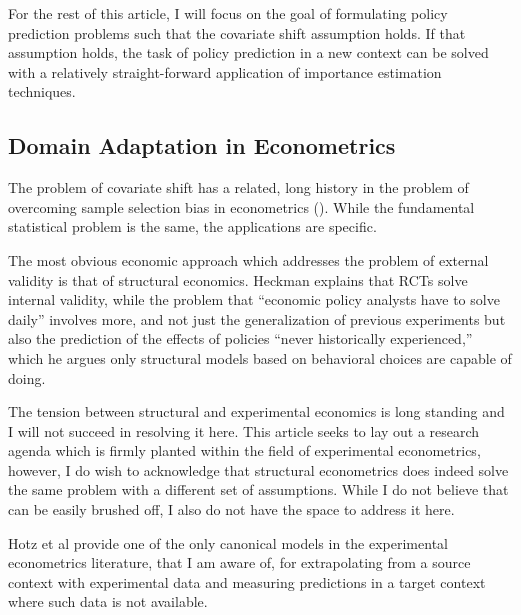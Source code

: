 \documentclass[a4paper,12pt]{article}
\begin{document}
For the rest of this article, I will focus on the goal of formulating policy prediction problems such that the covariate shift assumption holds. If that assumption holds, the task of policy prediction in a new context can be solved with a relatively straight-forward application of importance estimation techniques.

\subsection{ Domain Adaptation in Econometrics }

The problem of covariate shift has a related, long history in the problem of overcoming sample selection bias in econometrics (\cite{Manski1977}). While the fundamental statistical problem is the same, the applications are specific.

The most obvious economic approach which addresses the problem of external validity is that of structural economics. Heckman \parencite*{Heckman2008} explains that RCTs solve internal validity, while the problem that ``economic policy analysts have to solve daily'' involves more, and not just the generalization of previous experiments but also the prediction of the effects of policies ``never historically experienced,'' which he argues only structural models based on behavioral choices are capable of doing.

The tension between structural and experimental economics is long standing and I will not succeed in resolving it here. This article seeks to lay out a research agenda which is firmly planted within the field of experimental econometrics, however, I do wish to acknowledge that structural econometrics does indeed solve the same problem with a different set of assumptions. While I do not believe that can be easily brushed off, I also do not have the space to address it here.

Hotz et al \parencite*{Hotz2005} provide one of the only canonical models in the experimental econometrics literature, that I am aware of, for extrapolating from a source context with experimental data and measuring predictions in a target context where such data is not available.
\end{document}

